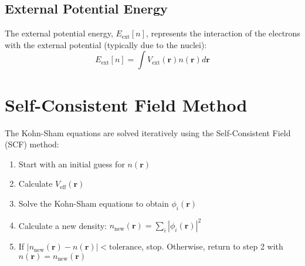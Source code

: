 \subsection{External Potential Energy}
The external potential energy, $E_{\text{ext}}[n]$, represents the interaction of the electrons with the external potential (typically due to the nuclei):
\begin{equation}
E_{\text{ext}}[n] = \int V_{\text{ext}}(\mathbf{r})n(\mathbf{r})d\mathbf{r}
\end{equation}
\section{Self-Consistent Field Method}
The Kohn-Sham equations are solved iteratively using the Self-Consistent Field (SCF) method:
\begin{enumerate}
\item Start with an initial guess for $n(\mathbf{r})$
\item Calculate $V_{\text{eff}}(\mathbf{r})$
\item Solve the Kohn-Sham equations to obtain $\phi_i(\mathbf{r})$
\item Calculate a new density: $n_{\text{new}}(\mathbf{r}) = \sum_i |\phi_i(\mathbf{r})|^2$
\item If $|n_{\text{new}}(\mathbf{r}) - n(\mathbf{r})| < \text{tolerance}$, stop. Otherwise, return to step 2 with $n(\mathbf{r}) = n_{\text{new}}(\mathbf{r})$
\end{enumerate}
